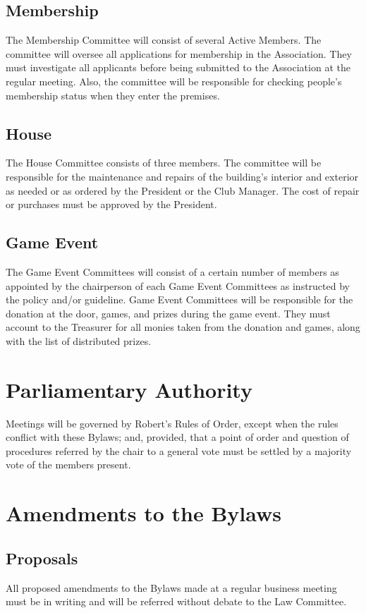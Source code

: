 \documentclass[12pt,letterpaper]{article}
\begin{document}
\subsection{Membership}
The Membership Committee will consist of several Active Members. The committee will oversee all applications for membership in the Association. They must investigate all applicants before being submitted to the Association at the regular meeting. Also, the committee will be responsible for checking people's membership status when they enter the premises.

\subsection{House}
The House Committee consists of three members. The committee will be responsible for the maintenance and repairs of the building's interior and exterior as needed or as ordered by the President or the Club Manager. The cost of repair or purchases must be approved by the President.

\subsection{Game Event}
The Game Event Committees will consist of a certain number of members as appointed by the chairperson of each Game Event Committees as instructed by the policy and/or guideline. Game Event Committees will be responsible for the donation at the door, games, and prizes during the game event. They must account to the Treasurer for all monies taken from the donation and games, along with the list of distributed prizes. 

\section{Parliamentary Authority}
Meetings will be governed by Robert's Rules of Order, except when the rules conflict with these Bylaws; and, provided, that a point of order and question of procedures referred by the chair to a general vote must be settled by a majority vote of the members present.

\section{Amendments to the Bylaws}

\subsection{Proposals}
All proposed amendments to the Bylaws made at a regular business meeting must be in writing and will be referred without debate to the Law Committee.
\end{document}

